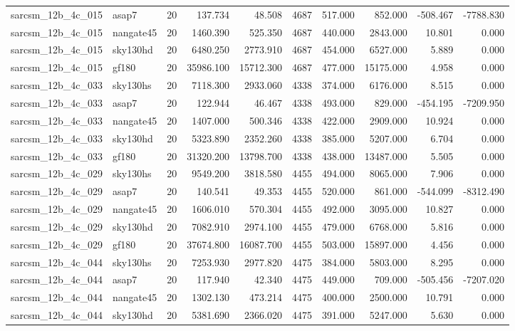 \begin{tabular}{llrrrrrrrr}
sarcsm\_12b\_4c\_015 & asap7 & 20 & 137.734 & 48.508 & 4687 & 517.000 & 852.000 & -508.467 & -7788.830 \\
sarcsm\_12b\_4c\_015 & nangate45 & 20 & 1460.390 & 525.350 & 4687 & 440.000 & 2843.000 & 10.801 & 0.000 \\
sarcsm\_12b\_4c\_015 & sky130hd & 20 & 6480.250 & 2773.910 & 4687 & 454.000 & 6527.000 & 5.889 & 0.000 \\
sarcsm\_12b\_4c\_015 & gf180 & 20 & 35986.100 & 15712.300 & 4687 & 477.000 & 15175.000 & 4.958 & 0.000 \\
sarcsm\_12b\_4c\_033 & sky130hs & 20 & 7118.300 & 2933.060 & 4338 & 374.000 & 6176.000 & 8.515 & 0.000 \\
sarcsm\_12b\_4c\_033 & asap7 & 20 & 122.944 & 46.467 & 4338 & 493.000 & 829.000 & -454.195 & -7209.950 \\
sarcsm\_12b\_4c\_033 & nangate45 & 20 & 1407.000 & 500.346 & 4338 & 422.000 & 2909.000 & 10.924 & 0.000 \\
sarcsm\_12b\_4c\_033 & sky130hd & 20 & 5323.890 & 2352.260 & 4338 & 385.000 & 5207.000 & 6.704 & 0.000 \\
sarcsm\_12b\_4c\_033 & gf180 & 20 & 31320.200 & 13798.700 & 4338 & 438.000 & 13487.000 & 5.505 & 0.000 \\
sarcsm\_12b\_4c\_029 & sky130hs & 20 & 9549.200 & 3818.580 & 4455 & 494.000 & 8065.000 & 7.906 & 0.000 \\
sarcsm\_12b\_4c\_029 & asap7 & 20 & 140.541 & 49.353 & 4455 & 520.000 & 861.000 & -544.099 & -8312.490 \\
sarcsm\_12b\_4c\_029 & nangate45 & 20 & 1606.010 & 570.304 & 4455 & 492.000 & 3095.000 & 10.827 & 0.000 \\
sarcsm\_12b\_4c\_029 & sky130hd & 20 & 7082.910 & 2974.100 & 4455 & 479.000 & 6768.000 & 5.816 & 0.000 \\
sarcsm\_12b\_4c\_029 & gf180 & 20 & 37674.800 & 16087.700 & 4455 & 503.000 & 15897.000 & 4.456 & 0.000 \\
sarcsm\_12b\_4c\_044 & sky130hs & 20 & 7253.930 & 2977.820 & 4475 & 384.000 & 5803.000 & 8.295 & 0.000 \\
sarcsm\_12b\_4c\_044 & asap7 & 20 & 117.940 & 42.340 & 4475 & 449.000 & 709.000 & -505.456 & -7207.020 \\
sarcsm\_12b\_4c\_044 & nangate45 & 20 & 1302.130 & 473.214 & 4475 & 400.000 & 2500.000 & 10.791 & 0.000 \\
sarcsm\_12b\_4c\_044 & sky130hd & 20 & 5381.690 & 2366.020 & 4475 & 391.000 & 5247.000 & 5.630 & 0.000 \\

\end{tabular}
